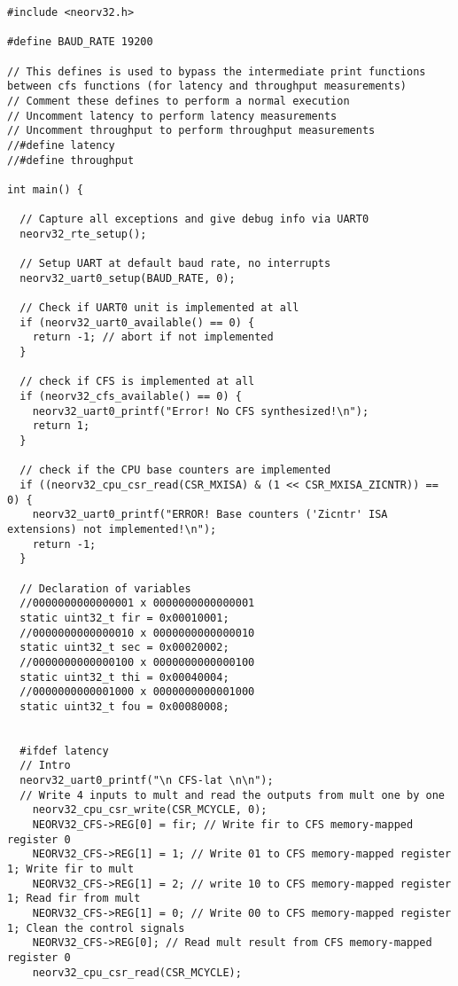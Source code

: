 \begin{code}
\begin{verbatim}
#include <neorv32.h>

#define BAUD_RATE 19200

// This defines is used to bypass the intermediate print functions between cfs functions (for latency and throughput measurements)
// Comment these defines to perform a normal execution
// Uncomment latency to perform latency measurements
// Uncomment throughput to perform throughput measurements
//#define latency
//#define throughput

int main() {

  // Capture all exceptions and give debug info via UART0
  neorv32_rte_setup();

  // Setup UART at default baud rate, no interrupts
  neorv32_uart0_setup(BAUD_RATE, 0);

  // Check if UART0 unit is implemented at all
  if (neorv32_uart0_available() == 0) {
    return -1; // abort if not implemented
  }

  // check if CFS is implemented at all
  if (neorv32_cfs_available() == 0) {
    neorv32_uart0_printf("Error! No CFS synthesized!\n");
    return 1;
  }

  // check if the CPU base counters are implemented
  if ((neorv32_cpu_csr_read(CSR_MXISA) & (1 << CSR_MXISA_ZICNTR)) == 0) {
    neorv32_uart0_printf("ERROR! Base counters ('Zicntr' ISA extensions) not implemented!\n");
    return -1;
  }

  // Declaration of variables 
  //0000000000000001 x 0000000000000001
  static uint32_t fir = 0x00010001;
  //0000000000000010 x 0000000000000010
  static uint32_t sec = 0x00020002;
  //0000000000000100 x 0000000000000100
  static uint32_t thi = 0x00040004;
  //0000000000001000 x 0000000000001000
  static uint32_t fou = 0x00080008;


  #ifdef latency
  // Intro
  neorv32_uart0_printf("\n CFS-lat \n\n");
  // Write 4 inputs to mult and read the outputs from mult one by one
    neorv32_cpu_csr_write(CSR_MCYCLE, 0);
    NEORV32_CFS->REG[0] = fir; // Write fir to CFS memory-mapped register 0
    NEORV32_CFS->REG[1] = 1; // Write 01 to CFS memory-mapped register 1; Write fir to mult
    NEORV32_CFS->REG[1] = 2; // write 10 to CFS memory-mapped register 1; Read fir from mult
    NEORV32_CFS->REG[1] = 0; // Write 00 to CFS memory-mapped register 1; Clean the control signals
    NEORV32_CFS->REG[0]; // Read mult result from CFS memory-mapped register 0  
    neorv32_cpu_csr_read(CSR_MCYCLE); 


\end{verbatim}
\end{code}
